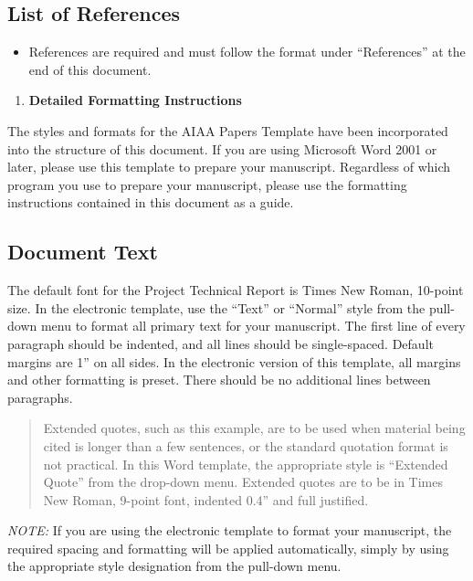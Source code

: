 \documentclass[
]{article}
\begin{document}
\subsection{List of References}\label{list-of-references}

\begin{itemize}
\item
  References are required and must follow the format under
  ``References'' at the end of this document.
\end{itemize}

\begin{enumerate}
\def\labelenumi{\arabic{enumi}.}
\setcounter{enumi}{3}
\item
  \textbf{Detailed Formatting Instructions}
\end{enumerate}

The styles and formats for the AIAA Papers Template have been
incorporated into the structure of this document. If you are using
Microsoft Word 2001 or later, please use this template to prepare your
manuscript. Regardless of which program you use to prepare your
manuscript, please use the formatting instructions contained in this
document as a guide.

\subsection{Document Text}\label{document-text}

The default font for the Project Technical Report is Times New Roman,
10-point size. In the electronic template, use the ``Text'' or
``Normal'' style from the pull-down menu to format all primary text for
your manuscript. The first line of every paragraph should be indented,
and all lines should be single-spaced. Default margins are 1'' on all
sides. In the electronic version of this template, all margins and other
formatting is preset. There should be no additional lines between
paragraphs.

\begin{quote}
Extended quotes, such as this example, are to be used when material
being cited is longer than a few sentences, or the standard quotation
format is not practical. In this Word template, the appropriate style is
``Extended Quote'' from the drop-down menu. Extended quotes are to be in
Times New Roman, 9-point font, indented 0.4'' and full justified.
\end{quote}

\emph{NOTE:} If you are using the electronic template to format your
manuscript, the required spacing and formatting will be applied
automatically, simply by using the appropriate style designation from
the pull-down menu.
\end{document}
